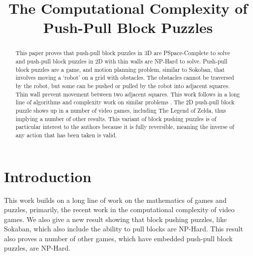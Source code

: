 \documentclass[11pt]{article}
\begin{document}
\title{The Computational Complexity of Push-Pull Block Puzzles}


\begin{abstract}
This paper proves that push-pull block puzzles in 3D are PSpace-Complete to solve and push-pull block puzzles in 2D with thin walls are NP-Hard to solve. Push-pull block puzzles are a game, and motion planning problem, similar to Sokoban, that involves moving a `robot' on a grid with obstacles. The obstacles cannot be traversed by the robot, but some can be pushed or pulled by the robot into adjacent squares. Thin wall prevent movement between two adjacent squares. This work follows in a long line of algorithms and complexity work on similar problems \cite{PushPull91}\cite{Push100}\cite{Push*00}\cite{PushPushk04}\cite{non-crossing01}\cite{DO92}\cite{Push2F02}\cite{Sokoban98}\cite{DZ96}\cite{Pull10}. The 2D push-pull block puzzle shows up in a number of video games, including The Legend of Zelda, thus implying a number of other results. This variant of block pushing puzzles is of particular interest to the authors because it is fully reversible, meaning the inverse of any action that has been taken is valid.
\end{abstract}

\section{Introduction} 

This work builds on a long line of work on the mathematics of games and puzzles, primarily, the recent work in the computational complexity of video games.  We also give a new result showing that block pushing puzzles, like Sokaban, which also include the ability to pull blocks are NP-Hard. This result also proves a number of other games, which have embedded push-pull block puzzles, are NP-Hard.
\end{document}
